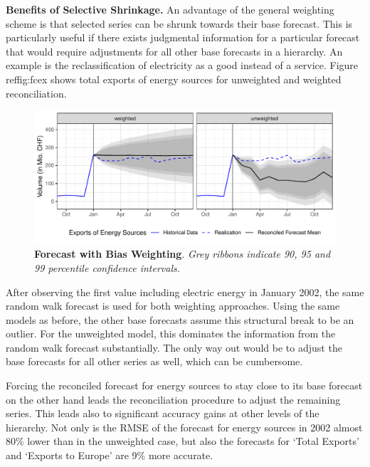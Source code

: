 \documentclass[a4paper,fleqn,11pt]{article}
\begin{document}
\noindent\textbf{Benefits of Selective Shrinkage.} An advantage of the general weighting scheme is that selected series can be shrunk towards their base forecast. This is particularly useful if there exists judgmental information for a particular forecast that would require adjustments for all other base forecasts in a hierarchy. An example is the reclassification of electricity as a good instead of a service. Figure ref{fig:fcex} shows total exports of energy sources for unweighted and weighted reconciliation.
\begin{figure}[H]
	\includegraphics[width=\textwidth]{fig/fig_electricity}
	\caption[Forecast with Bias Weighting]{\textbf{Forecast with Bias Weighting}. \textit{Grey ribbons indicate 90, 95 and 99 percentile confidence intervals.}}\label{fig:fcex}
\end{figure}
After observing the first value including electric energy in January 2002, the same random walk forecast is used for both weighting approaches. Using the same models as before, the other base forecasts assume this structural break to be an outlier. For the unweighted model, this dominates the information from the random walk forecast substantially. The only way out would be to adjust the base forecasts for all other series as well, which can be cumbersome.

Forcing the reconciled forecast for energy sources to stay close to its base forecast on the other hand leads the reconciliation procedure to adjust the remaining series. This leads also to significant accuracy gains at other levels of the hierarchy. Not only is the RMSE of the forecast for energy sources in 2002 almost 80\% lower than in the unweighted case, but also the forecasts for `Total Exports' and `Exports to Europe' are 9\% more accurate.

\clearpage
\end{document}
